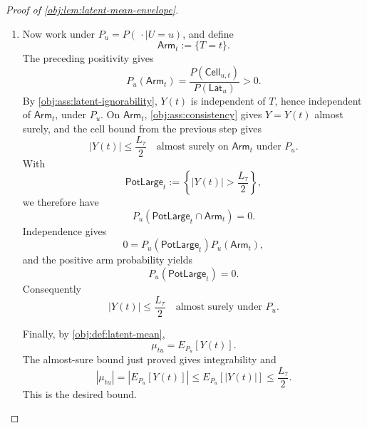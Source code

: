 \begin{proof}[Proof of \cref{obj:lem:latent-mean-envelope}]
\begin{enumerate}
\item Now work under \(P_u=P(\,\cdot\mid U=u)\), and define
\[
\mathsf{Arm}_t:=\{T=t\}.
\]
The preceding positivity gives
\[
P_u(\mathsf{Arm}_t)
=
\frac{P(\mathsf{Cell}_{u,t})}{P(\mathsf{Lat}_u)}
>0.
\]
By \cref{obj:ass:latent-ignorability}, \(Y(t)\) is independent of \(T\), hence independent of \(\mathsf{Arm}_t\), under \(P_u\). On \(\mathsf{Arm}_t\), \cref{obj:ass:consistency} gives \(Y=Y(t)\) almost surely, and the cell bound from the previous step gives
\[
|Y(t)|\le \frac{L_\tau}{2}
\quad\text{almost surely on }\mathsf{Arm}_t\text{ under }P_u.
\]
With
\[
\mathsf{PotLarge}_t:=\left\{|Y(t)|>\frac{L_\tau}{2}\right\},
\]
we therefore have
\[
P_u(\mathsf{PotLarge}_t\cap\mathsf{Arm}_t)=0.
\]
Independence gives
\[
0
=
P_u(\mathsf{PotLarge}_t)P_u(\mathsf{Arm}_t),
\]
and the positive arm probability yields
\[
P_u(\mathsf{PotLarge}_t)=0.
\]
Consequently
\[
|Y(t)|\le \frac{L_\tau}{2}
\quad\text{almost surely under }P_u. %
\]

Finally, by \cref{obj:def:latent-mean},
\[
\mu_{tu}=E_{P_u}[Y(t)].
\]
The almost-sure bound just proved gives integrability and
\[
|\mu_{tu}|
=
\left|E_{P_u}[Y(t)]\right|
\le
E_{P_u}[|Y(t)|]
\le
\frac{L_\tau}{2}.
\]
This is the desired bound. %
\end{enumerate}
\end{proof}
